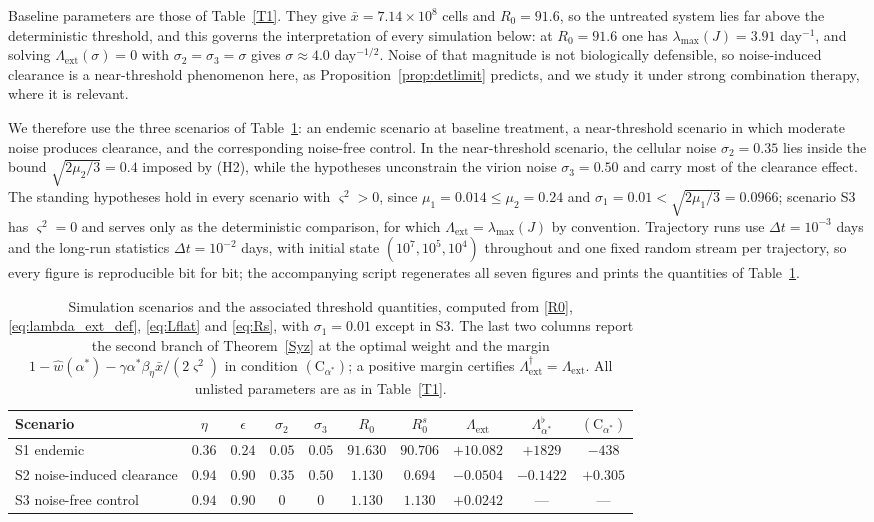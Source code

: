 \documentclass{article}
\newcommand{\betaeta}{\beta_\eta}
\newcommand{\Rz}{R_0}
\newcommand{\Rs}{R_0^{s}}
\newcommand{\Lext}{\Lambda_{\mathrm{ext}}}
\newcommand{\Lsharp}{\Lambda_{\mathrm{ext}}^{\dagger}}
\begin{document}
Baseline parameters are those of Table~\ref{T1}. They give $\bar x=7.14\times10^{8}$ cells and $\Rz=91.6$, so the untreated system lies far above the deterministic threshold, and this governs the interpretation of every simulation below: at $\Rz=91.6$ one has $\lambda_{\max}(J)=3.91$ day$^{-1}$, and solving $\Lext(\sigma)=0$ with $\sigma_2=\sigma_3=\sigma$ gives $\sigma\approx4.0$ day$^{-1/2}$. Noise of that magnitude is not biologically defensible, so noise-induced clearance is a near-threshold phenomenon here, as Proposition~\ref{prop:detlimit} predicts, and we study it under strong combination therapy, where it is relevant.

We therefore use the three scenarios of Table~\ref{T3}: an endemic scenario at baseline treatment, a near-threshold scenario in which moderate noise produces clearance, and the corresponding noise-free control. In the near-threshold scenario, the cellular noise $\sigma_2=0.35$ lies inside the bound $\sqrt{2\mu_2/3}=0.4$ imposed by (H2), while the hypotheses unconstrain the virion noise $\sigma_3=0.50$ and carry most of the clearance effect. The standing hypotheses hold in every scenario with $\varsigma^2>0$, since $\mu_1=0.014\le\mu_2=0.24$ and $\sigma_1=0.01<\sqrt{2\mu_1/3}=0.0966$; scenario S3 has $\varsigma^2=0$ and serves only as the deterministic comparison, for which $\Lext=\lambda_{\max}(J)$ by convention. Trajectory runs use $\Delta t=10^{-3}$ days and the long-run statistics $\Delta t=10^{-2}$ days, with initial state $(10^{7},10^{5},10^{4})$ throughout and one fixed random stream per trajectory, so every figure is reproducible bit for bit; the accompanying script regenerates all seven figures and prints the quantities of Table~\ref{T3}.

\begin{table}[H]
\centering
\caption{Simulation scenarios and the associated threshold quantities, computed from \eqref{R0}, \eqref{eq:lambda_ext_def}, \eqref{eq:Lflat} and \eqref{eq:Rs}, with $\sigma_1=0.01$ except in S3. The last two columns report the second branch of Theorem~\ref{Syz} at the optimal weight and the margin $1-\widehat w(\alpha^\ast)-\gamma\alpha^\ast\betaeta\bar x/(2\varsigma^2)$ in condition $(\mathrm{C}_{\alpha^\ast})$; a positive margin certifies $\Lsharp=\Lext$. All unlisted parameters are as in Table~\ref{T1}.}
\small
\begin{tabular}{lccccccccc}
\toprule
\textbf{Scenario} & $\eta$ & $\epsilon$ & $\sigma_2$ & $\sigma_3$ & $\Rz$ & $\Rs$ & $\Lext$ & $\Lambda^{\flat}_{\alpha^\ast}$ & $(\mathrm{C}_{\alpha^\ast})$ \\
\midrule
S1 endemic                 & $0.36$ & $0.24$ & $0.05$ & $0.05$ & $91.630$ & $90.706$ & $+10.082$ & $+1829$ & $-438$ \\
S2 noise-induced clearance & $0.94$ & $0.90$ & $0.35$ & $0.50$ & $1.130$  & $0.694$  & $-0.0504$ & $-0.1422$ & $+0.305$ \\
S3 noise-free control      & $0.94$ & $0.90$ & $0$    & $0$    & $1.130$  & $1.130$  & $+0.0242$ & --- & --- \\
\bottomrule
\end{tabular}
\label{T3}
\end{table}
\end{document}
